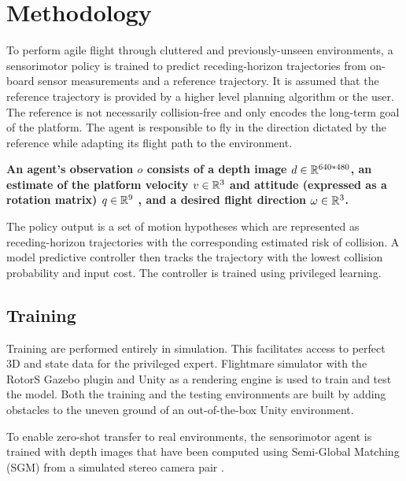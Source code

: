 \chapter{Methodology}
To perform agile flight through cluttered and previously-unseen environments, a sensorimotor policy is trained to predict receding-horizon \cite{receding_horizon} trajectories from on-board sensor measurements and a reference trajectory. It is assumed that the reference trajectory is provided by a higher level planning algorithm \cite{global_planning} or the user. The reference is not necessarily collision-free and only encodes the long-term goal of the platform. The agent is responsible to fly in the direction dictated by the reference while adapting its flight path to the environment.

\textbf{An agent’s observation $o$ consists of a depth image $d \in \mathbb{R}^{640*480}$, an estimate of the platform velocity $v \in \mathbb{R}^3$ and attitude (expressed as a rotation matrix) $q \in \mathbb{R}^9$ , and a desired flight direction $\omega \in \mathbb{R}^3$.}

The policy output is a set of motion hypotheses which are represented as receding-horizon \cite{receding_horizon} trajectories with the corresponding estimated risk of collision. A model predictive controller then tracks the trajectory with the lowest collision probability and input cost. The controller is trained using privileged learning.


\section{Training}
Training are performed entirely in simulation. This facilitates access to perfect 3D and state data for the privileged expert. Flightmare simulator with the RotorS Gazebo plugin and Unity as a rendering engine is used to train and test the model. Both the training and the testing environments are built by adding obstacles to the uneven ground of an out-of-the-box Unity environment.

To enable zero-shot transfer to real environments, the sensorimotor agent is trained with depth images that have been computed using Semi-Global Matching (SGM) from a simulated stereo camera pair \cite{stereoMatching}. 

